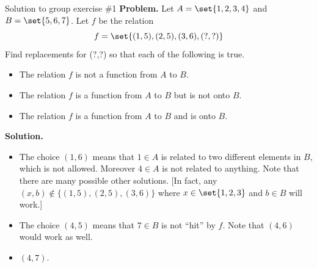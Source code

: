 \documentclass[10pt]{beamer}
\begin{document}
\begin{frame}{Solution to group exercise \#1}
\textbf{Problem.}  Let $A =\set{1,2,3,4}$ and $B=\set{5,6,7}$.  Let $f$ be the relation
	\[  f=\set{(1,5),(2,5), (3,6),(?,?)}\]
	Find replacements for (?,?) so that each of the following is true.
	\begin{itemize} 
		\item [a.] The relation $f$ is not a function from $A$ to $B$.
		\item [b.] The relation $f$ is a function from $A$ to $B$ but is not onto $B$.
		\item [c.] The relation $f$ is a function from $A$ to $B$ and is onto $B$.
	\end{itemize}
\vfill 
\textbf{Solution.} 
	\begin{itemize} 
		\item [a.] The choice $(1,6)$ means that $1 \in A$ is related to two different elements in $B$, which is not allowed.  Moreover $4 \in A$ is not related to anything.  Note that there are many possible other solutions. [In fact, any $(x,b) \not\in \big\{(1,5),(2,5), (3,6) \big\}$  where $x \in \set{1,2,3}$ and $b \in B$ will work.]
		\item [b.] The choice $(4,5)$ means that $7 \in B$ is not \enquote{hit} by $f$.   Note that $(4,6)$ would work as well.
		\item [c.] $(4,7)$. 
	\end{itemize}

\end{frame}
\end{document}
